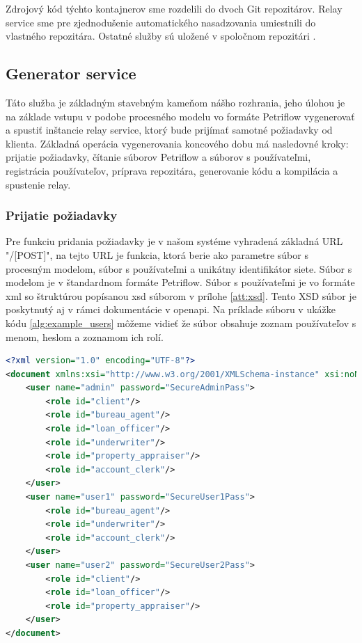 Zdrojový kód týchto kontajnerov sme rozdelili do dvoch Git repozitárov. Relay service sme pre zjednodušenie automatického nasadzovania umiestnili do vlastného repozitára\cite{dp_relay}. Ostatné služby sú uložené v spoločnom repozitári \cite{dp_repo}. 



\subsection{Generator service}
Táto služba je základným stavebným kameňom nášho rozhrania, jeho úlohou je na základe vstupu v podobe procesného modelu vo formáte Petriflow vygenerovať a spustiť inštancie relay service, ktorý bude prijímať samotné požiadavky od klienta. Základná operácia vygenerovania koncového dobu má nasledovné kroky:
prijatie požiadavky,
čítanie súborov Petriflow a súborov s používateľmi,
registrácia používateľov,
príprava repozitára,
generovanie kódu
a kompilácia a spustenie relay.

\subsubsection{Prijatie požiadavky}
Pre funkciu pridania požiadavky je v našom systéme vyhradená základná URL "/[POST]", na tejto URL je funkcia, ktorá berie ako parametre súbor s procesným modelom, súbor s používateľmi a unikátny identifikátor siete. Súbor s modelom je v štandardnom formáte Petriflow. Súbor s používateľmi je vo formáte \acrshort{xml} so štruktúrou popísanou \acrshort{xsd} súborom v prílohe \ref{att:xsd}. Tento XSD súbor je poskytnutý aj v rámci dokumentácie v \acrshort{openapi}. Na príklade súboru v ukážke kódu \ref{alg:example_users} môžeme vidieť že súbor obsahuje zoznam používateľov s menom, heslom a zoznamom ich rolí.

\begin{lstlisting}[float, caption={Príklad súboru s používateľmi},label={alg:example_users},language=XML]
<?xml version="1.0" encoding="UTF-8"?>
<document xmlns:xsi="http://www.w3.org/2001/XMLSchema-instance" xsi:noNamespaceSchemaLocation="./users_schema.xsd">
	<user name="admin" password="SecureAdminPass">
		<role id="client"/>
		<role id="bureau_agent"/>
		<role id="loan_officer"/>
		<role id="underwriter"/>
		<role id="property_appraiser"/>
		<role id="account_clerk"/>
	</user>
	<user name="user1" password="SecureUser1Pass">
		<role id="bureau_agent"/>
		<role id="underwriter"/>
		<role id="account_clerk"/>
	</user>
	<user name="user2" password="SecureUser2Pass">
		<role id="client"/>
		<role id="loan_officer"/>
		<role id="property_appraiser"/>
	</user>
</document>
\end{lstlisting}

